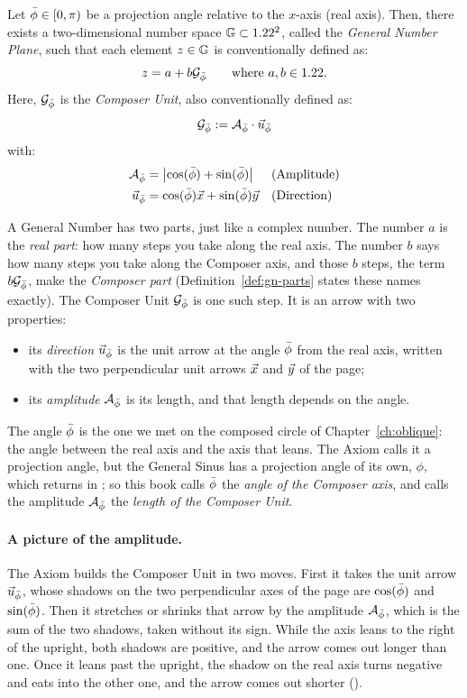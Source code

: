 \begin{axiom}\label{ax:gn}
Let $\bar{\phi} \in [0, \pi)$ be a projection angle relative to the $x$-axis (real axis). Then, there exists a two-dimensional number space $\mathbb{G} \subset 1.22^2$, called the \emph{General Number Plane}, such that each element $z \in \mathbb{G}$ is conventionally defined as:
\[
z = a + b\mathcal{G}_{\bar{\phi}} \qquad \text{where } a, b \in 1.22 .
\]
Here, $\mathcal{G}_{\bar{\phi}}$ is the \emph{Composer Unit}, also conventionally defined as:
\[
\mathcal{G}_{\bar{\phi}} := \mathcal{A}_{\bar{\phi}} \cdot \vec{u}_{\bar{\phi}}
\]
with:
\begin{align*}
\mathcal{A}_{\bar{\phi}} &= \left| \cos(\bar{\phi}) + \sin(\bar{\phi}) \right| && \text{(Amplitude)}\\
\vec{u}_{\bar{\phi}} &= \cos(\bar{\phi})\vec{x} + \sin(\bar{\phi})\vec{y} && \text{(Direction)}
\end{align*}
\end{axiom}

\begin{plainwords}
A General Number has two parts, just like a complex number. The number $a$ is the \emph{real part}: how many steps you take along the real axis. The number $b$ says how many steps you take along the Composer axis, and those $b$ steps, the term $b\mathcal{G}_{\bar{\phi}}$, make the \emph{Composer part} (Definition~\ref{def:gn-parts} states these names exactly). The Composer Unit $\mathcal{G}_{\bar{\phi}}$ is one such step. It is an arrow with two properties:
\begin{itemize}
  \item its \emph{direction} $\vec{u}_{\bar{\phi}}$ is the unit arrow at the angle $\bar{\phi}$ from the real axis, written with the two perpendicular unit arrows $\vec{x}$ and $\vec{y}$ of the page;
  \item its \emph{amplitude} $\mathcal{A}_{\bar{\phi}}$ is its length, and that length depends on the angle.
\end{itemize}
The angle $\bar{\phi}$ is the one we met on the composed circle of Chapter~\ref{ch:oblique}: the angle between the real axis and the axis that leans. The Axiom calls it a projection angle, but the General Sinus has a projection angle of its own, $\phi$, which returns in ; so this book calls $\bar{\phi}$ the \emph{angle of the Composer axis}, and calls the amplitude $\mathcal{A}_{\bar{\phi}}$ the \emph{length of the Composer Unit}.
\end{plainwords}

\paragraph{A picture of the amplitude.}
The Axiom builds the Composer Unit in two moves. First it takes the unit arrow $\vec{u}_{\bar{\phi}}$, whose shadows on the two perpendicular axes of the page are $\cos(\bar{\phi})$ and $\sin(\bar{\phi})$. Then it stretches or shrinks that arrow by the amplitude $\mathcal{A}_{\bar{\phi}}$, which is the sum of the two shadows, taken without its sign. While the axis leans to the right of the upright, both shadows are positive, and the arrow comes out longer than one. Once it leans past the upright, the shadow on the real axis turns negative and eats into the other one, and the arrow comes out shorter ().

